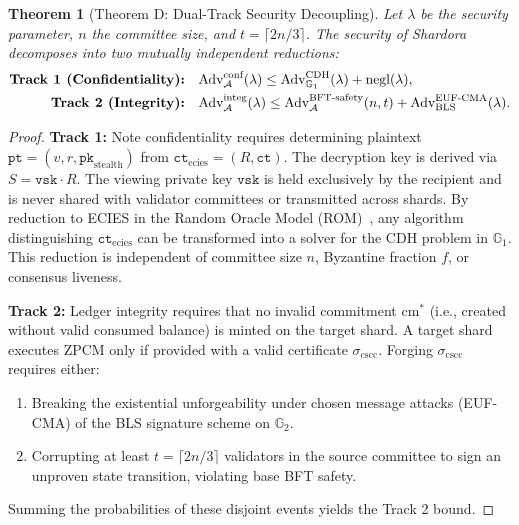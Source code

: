 \documentclass[journal,10pt,twocolumn]{IEEEtran}
\newtheorem{theorem}{Theorem}
\theoremstyle{definition}
\theoremstyle{remark}
\begin{document}
\begin{theorem}[Theorem D: Dual-Track Security Decoupling]\label{thm:dual_track}
Let $\lambda$ be the security parameter, $n$ the committee size, and $t = \lceil 2n/3 \rceil$. The security of Shardora decomposes into two mutually independent reductions:
\begin{align}
\text{\textbf{Track 1 (Confidentiality):}} \quad & \text{Adv}^{\text{conf}}_{\mathcal{A}}(\lambda) \le \text{Adv}^{\text{CDH}}_{\mathbb{G}_1}(\lambda) + \text{negl}(\lambda), \\
\text{\textbf{Track 2 (Integrity):}} \quad & \text{Adv}^{\text{integ}}_{\mathcal{A}}(\lambda) \le \text{Adv}^{\text{BFT-safety}}_{\mathcal{A}}(n, t) + \text{Adv}^{\text{EUF-CMA}}_{\text{BLS}}(\lambda).
\end{align}
\end{theorem}

\begin{proof}
\textbf{Track 1:} Note confidentiality requires determining plaintext $\mathtt{pt} = (v, r, \mathtt{pk}_{\text{stealth}})$ from $\mathtt{ct}_{\text{ecies}} = (R, \mathtt{ct})$. The decryption key is derived via $S = \mathtt{vsk} \cdot R$. The viewing private key $\mathtt{vsk}$ is held exclusively by the recipient and is never shared with validator committees or transmitted across shards. By reduction to ECIES in the Random Oracle Model (ROM)~\cite{abdalla2001requisite}, any algorithm distinguishing $\mathtt{ct}_{\text{ecies}}$ can be transformed into a solver for the CDH problem in $\mathbb{G}_1$. This reduction is independent of committee size $n$, Byzantine fraction $f$, or consensus liveness.

\textbf{Track 2:} Ledger integrity requires that no invalid commitment $\text{cm}^*$ (i.e., created without valid consumed balance) is minted on the target shard. A target shard executes ZPCM only if provided with a valid certificate $\sigma_{\text{cscc}}$. Forging $\sigma_{\text{cscc}}$ requires either:
\begin{enumerate}
    \item Breaking the existential unforgeability under chosen message attacks (EUF-CMA) of the BLS signature scheme on $\mathbb{G}_2$.
    \item Corrupting at least $t = \lceil 2n/3 \rceil$ validators in the source committee to sign an unproven state transition, violating base BFT safety.
\end{enumerate}
Summing the probabilities of these disjoint events yields the Track 2 bound.
\end{proof}
\end{document}
